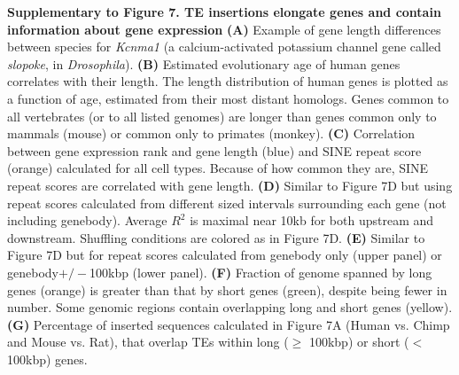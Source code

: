\textbf{Supplementary to Figure 7. TE insertions elongate genes and contain information about gene expression}
\textbf{(A)} Example of gene length differences between species for \textit{Kcnma1} (a calcium-activated potassium channel gene called \textit{slopoke}, in \textit{Drosophila}). 
\textbf{(B)} Estimated evolutionary age of human genes correlates with their length. The length distribution of human genes is plotted as a function of age, estimated from their most distant homologs. Genes common to all vertebrates (or to all listed genomes) are longer than genes common only to mammals (mouse) or common only to primates (monkey).
\textbf{(C)} Correlation between gene expression rank and gene length (blue) and SINE repeat score (orange) calculated for all cell types. Because of how common they are, SINE repeat scores are correlated with gene length.
\textbf{(D)} Similar to Figure 7D but using repeat scores calculated from different sized intervals surrounding each gene (not including genebody). Average $R^2$ is maximal near 10kb for both upstream and downstream. Shuffling conditions are colored as in Figure 7D.
\textbf{(E)} Similar to Figure 7D but for repeat scores calculated from genebody only (upper panel) or genebody$+/-$100kbp (lower panel).
\textbf{(F)} Fraction of genome spanned by long genes (orange) is greater than that by short genes (green), despite being fewer in number. Some genomic regions contain overlapping long and short genes (yellow).
\textbf{(G)} Percentage of inserted sequences calculated in Figure 7A (Human vs. Chimp and Mouse vs. Rat), that overlap TEs within long ($\geq$ 100kbp) or short ($<$100kbp) genes. 